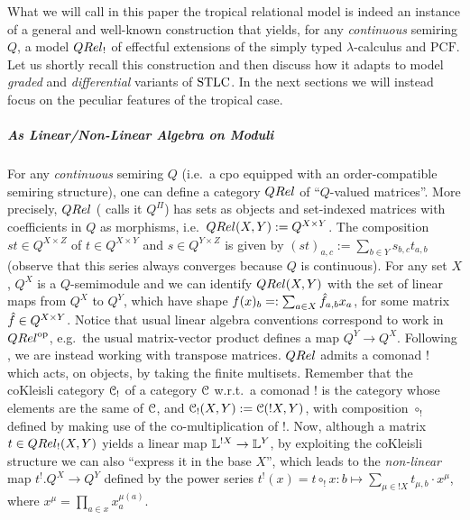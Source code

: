
What we will call in this paper the tropical relational model is indeed an instance of a general and well-known construction that yields, for any \emph{continuous} semiring $Q$, a model $\QREL_{!}$ of effectful extensions of the simply typed $\lambda$-calculus and $\mathrm{PCF}$. Let us shortly recall this construction and then discuss how it adapts to model \emph{graded} and \emph{differential} variants of $\mathrm{STLC}$. In the next sections we will instead focus on the peculiar features of the tropical case.

\subparagraph*{As Linear/Non-Linear Algebra on Moduli}
For any \emph{continuous} semiring $Q$ (i.e.~a cpo equipped with an order-compatible semiring structure), one can define a category $\QREL$ of ``$Q$-valued matrices''.
More precisely, $\QREL$ (\cite{Manzo2013} calls it $Q^\Pi$) has sets as objects and set-indexed matrices with coefficients in $Q$ as morphisms, i.e.~$\QREL(X,Y):=Q^{X\times Y}$.
The composition $st\in Q^{X\times Z}$ of $t\in Q^{X\times Y}$ and $s\in Q^{Y\times Z}$ is given by $(st)_{a,c}:=\sum_{b\in Y} s_{b,c}t_{a,b}$ (observe that this series always converges because $Q$ is continuous).
For any set $X$, $Q^X$ is a $Q$-semimodule and we can identify $\HOM{\QREL}{X}{Y}$ with the set of linear maps from $Q^X$ to $Q^Y$, which have shape $f(x)_b=:\sum_{a\in X} \hat{f}_{a,b}x_a$, for some matrix $\hat{f}\in Q^{X\times Y}$.
% 
Notice that usual linear algebra conventions correspond to work in $\QREL^{\op}$, %
e.g.\ the usual matrix-vector product defines a map $Q^Y\to Q^X$.
Following \cite{Manzo2013, Hofmann2014, Ehrhard2005}, we are instead working with transpose matrices.
$\QREL$ admits a comonad $!$ which acts, on objects, by taking the finite multisets.
Remember that the coKleisli category $\mathcal{C}_!$ of a category $\mathcal{C}$ w.r.t.\ a comonad $!$ is the category whose elements are the same of $\mathcal{C}$, and ${\mathcal{C}_!}(X,Y):={\mathcal{C}}(!X,Y)$, with composition $\circ_!$ defined by making use of the co-multiplication of $!$.
Now, although a matrix $t\in\HOM{\QREL_!}{X}{Y}$ yields a linear map $\mathbb{L}^{!X}\to\mathbb{L}^Y$, by exploiting the coKleisli structure we can also ``express it in the base $X$'', which leads to the \emph{non-linear} map $t^{!}.Q^{X}\to Q^{Y}$ defined by the power series
$
t^{!}(x)=t\circ_{!}x : b \mapsto \sum_{\mu\in !X}t_{\mu,b}\cdot x^{\mu}
$, 
where $x^{\mu}= \prod_{a\in x}x_{a}^{\mu(a)}$. 

